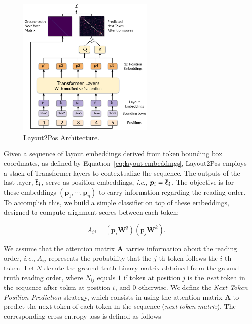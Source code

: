 \begin{figure}
  \centering
  \includegraphics[width=0.6\textwidth]{images/chapter4/Layout2Pos.pdf}
  \caption{Layout2Pos Architecture.}
  \label{fig:layout2pos-module}
\end{figure}

Given a sequence of layout embeddings derived from token bounding box coordinates, as defined by Equation~\ref{eq:layout-embeddings}, Layout2Pos employs a stack of Transformer layers to contextualize the sequence. The outputs of the last layer, $\bm{\overline{\boldsymbol{\ell}}_i}$, serve as position embeddings, \textit{i.e.}, $\bm{p}_i = \bm{\overline{\boldsymbol{\ell}}_i}$. The objective is for these embeddings $(\bm{p}_1, \cdots, \bm{p}_n)$ to carry information regarding the reading order. To accomplish this, we build a simple classifier on top of these embeddings, designed to compute alignment scores between each token:

\begin{equation}
  A_{ij} = \left(\bm{p}_i \bm{W}^q\right)\left(\bm{p}_j \bm{W}^k\right).
\end{equation}

\noindent We assume that the attention matrix $\bm{A}$ carries information about the reading order, \textit{i.e.}, $A_{ij}$ represents the probability that the $j$-th token follows the $i$-th token. Let $N$ denote the ground-truth binary matrix obtained from the ground-truth reading order, where $N_{ij}$ equals $1$ if token at position $j$ is the \textit{next} token in the sequence after token at position $i$, and $0$ otherwise. We define the \textit{Next Token Position Prediction} strategy, which consists in using the attention matrix $\bm{A}$ to predict the next token of each token in the sequence (\textit{next token matrix}). The corresponding cross-entropy loss is defined as follows:

